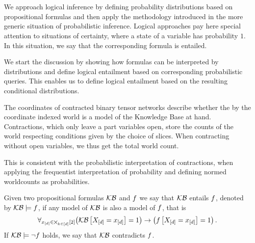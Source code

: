 \chapter{\chatextlogicalReasoning}\label{cha:logicalReasoning}

We approach logical inference by defining probability distributions based on propositional formulas and then apply the methodology introduced in the more generic situation of probabilistic inference.
Logical approaches pay here special attention to situations of certainty, where a state of a variable has probability $1$.
In this situation, we say that the corresponding formula is entailed.


We start the discussion by showing how formulas can be interpreted by distributions and define logical entailment based on corresponding probabilistic queries.
This enables us to define logical entailment based on the resulting conditional distributions.


\begin{remark}
	The coordinates of contracted binary tensor networks describe whether the by the coordinate indexed world is a model of the Knowledge Base at hand.
	Contractions, which only leave a part variables open, store the counts of the world respecting conditions given by the choice of slices. 
	When contracting without open variables, we thus get the total world count.
	
	This is consistent with the probabilistic interpretation of contractions, when applying the frequentist interpretation of probability and defining normed worldcounts as probabilities.
\end{remark}



\begin{definition}\label{def:logicalEntailment}
	Given two propositional formulas $\mathcal{KB}$ and $f$ we say that $\mathcal{KB}$ entails $f$, denoted by $\mathcal{KB}\models f$, if any model of $\mathcal{KB}$ is also a model of $f$, that is
		\[ \forall_{x_{[d]}\in\bigtimes_{k\in[d]}[2]} \big(\mathcal{KB}\left[X_{[d]}=x_{[d]}\right]=1\big) \rightarrow \big(f\left[X_{[d]}=x_{[d]}\right]=1\big) \, . \]
	If $\mathcal{KB}\models\lnot f$ holds, we say that $\mathcal{KB}$ contradicts $f$.
\end{definition}

